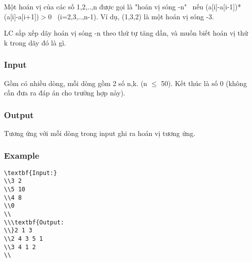 



   Một hoán vị của các số 1,2,..,n được gọi là "hoán vị sóng -n"  nếu  (a[i]-a[i-1])*(a[i]-a[i+1])$>$0  (i=2,3,..,n-1). Ví dụ, (1,3,2) là một hoán vị sóng -3.  

   LC sắp xếp dãy hoán vị sóng -n theo thứ tự tăng dần, và muốn biết hoán vị thứ k trong dãy đó là gì.  

\subsubsection{   Input  }

   Gồm có nhiều dòng, mỗi dòng gồm 2 số n,k. (n $\le$ 50). Kết thúc là số 0 (không cần đưa ra đáp án cho trường hợp này).  

\subsubsection{   Output  }

   Tương ứng với mỗi dòng trong  input ghi ra hoán vị tương ứng.  

\subsubsection{   Example  }
\begin{verbatim}
\textbf{Input:}
\\3 2
\\5 10
\\4 8
\\0
\\
\\\textbf{Output:
\\}2 1 3
\\2 4 3 5 1
\\3 4 1 2
\\\end{verbatim}
